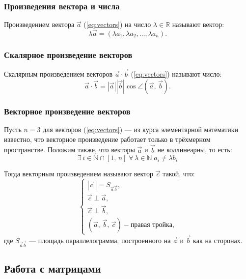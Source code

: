 \subsubsection{Произведения вектора и числа}
Произведением вектора $\Vec{a}$ (\ref{eq:vectors}) на число $\lambda \in \mathbb{R}$ называют вектор:
\begin{equation}
    \lambda\Vec{a} = \left(\lambda a_1, \lambda a_2, \dots, \lambda a_n\right).
\end{equation}

\subsubsection{Скалярное произведение векторов}
Скалярным произведением векторов $\Vec{a} \cdot \Vec{b}$ (\ref{eq:vectors}) называют число:
\begin{equation}
    \Vec{a} \cdot \Vec{b} = \left|\Vec{a}\right|\left|\Vec{b}\right|\cos\angle\left(\Vec{a},\,\Vec{b}\right).
\end{equation}

\subsubsection{Векторное произведение векторов}
Пусть $n = 3$ для векторов (\ref{eq:vectors}) --- из курса элементарной математики известно, что векторное произведение работает только в трёхмерном пространстве. Положим также, что векторы $\Vec{a}$ и $\Vec{b}$ не коллинеарны, то есть:
\begin{equation*}
    \exists\,i \in \mathbb{N}\cap\left[1,\,n\right]\;\forall\,\lambda\in\mathbb{N}\;a_i \neq \lambda b_i
\end{equation*}

Тогда векторным произведением называют вектор $\Vec{c}$ такой, что:
\begin{equation*}
    \begin{cases}
        \left|\Vec{c}\,\right| = S_{\Vec{a}\Vec{b}}, \\
        \Vec{c} \perp \Vec{a}, \\
        \Vec{c} \perp \Vec{b}, \\
        \left(\Vec{a},\,\Vec{b},\,\Vec{c}\right) - \textrm{правая тройка,}
    \end{cases}
\end{equation*}
где $S_{\Vec{a}\Vec{b}}$ --- площадь параллелограмма, построенного на $\Vec{a}$ и $\Vec{b}$ как на сторонах.

\subsection{Работа с матрицами}
